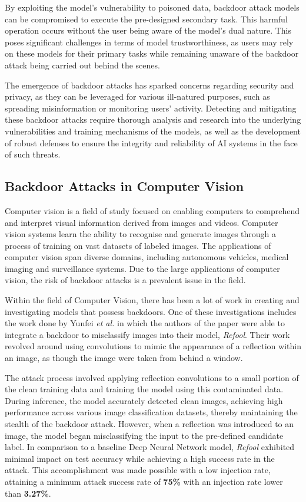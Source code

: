 By exploiting the model's vulnerability to poisoned data, backdoor attack models can be compromised to execute the pre-designed secondary task. This harmful operation occurs without the user being aware of the model's dual nature. This poses significant challenges in terms of model trustworthiness, as users may rely on these models for their primary tasks while remaining unaware of the backdoor attack being carried out behind the scenes.

The emergence of backdoor attacks has sparked concerns regarding security and privacy, as they can be leveraged for various ill-natured purposes, such as spreading misinformation or monitoring users' activity. Detecting and mitigating these backdoor attacks require thorough analysis and research into the underlying vulnerabilities and training mechanisms of the models, as well as the development of robust defenses to ensure the integrity and reliability of AI systems in the face of such threats.

\subsection{Backdoor Attacks in Computer Vision}

Computer vision is a field of study focused on enabling computers to comprehend and interpret visual information derived from images and videos. Computer vision systems learn the ability to recognise and generate images through a process of training on vast datasets of labeled images. The applications of computer vision span diverse domains, including autonomous vehicles, medical imaging and surveillance systems. Due to the large applications of computer vision, the risk of backdoor attacks is a prevalent issue in the field.

Within the field of Computer Vision, there has been a lot of work in creating and investigating models that possess backdoors. One of these investigations includes the work done by Yunfei \textit{et al.} \cite{DBLP:2007.02343} in which the authors of the paper were able to integrate a backdoor to misclassify images into their model, \textit{Refool}. Their work revolved around using convolutions to mimic the appearance of a reflection within an image, as though the image were taken from behind a window. 

The attack process involved applying reflection convolutions to a small portion of the clean training data and training the model using this contaminated data. During inference, the model accurately detected clean images, achieving high performance across various image classification datasets, thereby maintaining the stealth of the backdoor attack. However, when a reflection was introduced to an image, the model began misclassifying the input to the pre-defined candidate label. In comparison to a baseline Deep Neural Network model, \textit{Refool} exhibited minimal impact on test accuracy while achieving a high success rate in the attack. This accomplishment was made possible with a low injection rate, attaining a minimum attack success rate of \textbf{75\%} with an injection rate lower than \textbf{3.27\%}.

